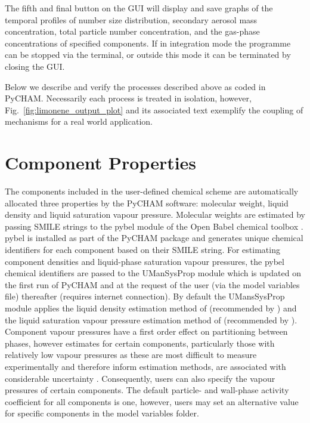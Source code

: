 \documentclass[gmd, manuscript]{copernicus}
\begin{document}
The fifth and final button on the GUI will display and save graphs of the temporal profiles of number size distribution, secondary aerosol mass concentration, total particle number concentration, and the gas-phase concentrations of specified components.  If in integration mode the programme can be stopped via the terminal, or outside this mode it can be terminated by closing the GUI.

Below we describe and verify the processes described above as coded in PyCHAM.  Necessarily each process is treated in isolation, however, Fig.~\ref{fig:limonene_output_plot} and its associated text exemplify the coupling of mechanisms for a real world application.

\section{Component Properties}

The components included in the user-defined chemical scheme are automatically allocated three properties by the PyCHAM software: molecular weight, liquid density and liquid saturation vapour pressure.  Molecular weights are  estimated by passing SMILE strings to the pybel module of the Open Babel chemical toolbox \citep{OBoyle2011}.  pybel is installed as part of the PyCHAM package and generates unique chemical identifiers for each component based on their SMILE string.  For estimating component densities and liquid-phase saturation vapour pressures, the pybel chemical identifiers are passed to the UManSysProp module \citep{Topping2016} which is updated on the first run of PyCHAM and at the request of the user (via the model variables file) thereafter (requires internet connection).  By default the UMansSysProp module applies the liquid density estimation method of \citet{Girolami1994} (recommended by \citet{Barley2013}) and the liquid saturation vapour pressure estimation method of \citet{Nannoolal2008} (recommended by \citet{OMeara2014}).  Component vapour pressures have a first order effect on partitioning between phases, however estimates for certain components, particularly those with relatively low vapour pressures as these are most difficult to measure experimentally and therefore inform estimation methods,  are associated with considerable uncertainty \citep{OMeara2014}.  Consequently, users can also specify the vapour pressures of certain components.  The default particle- and wall-phase activity coefficient for all components is one, however, users may set an alternative value for specific components in the model variables folder.
\end{document}
